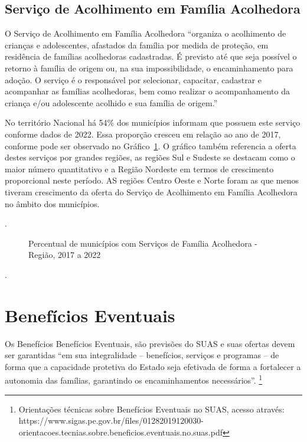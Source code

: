\documentclass[
  letterpaper,
  DIV=11,
  numbers=noendperiod]{scrreprt}
\begin{document}
\subsection{Serviço de Acolhimento em Família
Acolhedora}\label{serviuxe7o-de-acolhimento-em-famuxedlia-acolhedora}

O Serviço de Acolhimento em Família Acolhedora ``organiza o acolhimento
de crianças e adolescentes, afastados da família por medida de proteção,
em residência de famílias acolhedoras cadastradas. É previsto até que
seja possível o retorno à família de origem ou, na sua impossibilidade,
o encaminhamento para adoção. O serviço é o responsável por selecionar,
capacitar, cadastrar e acompanhar as famílias acolhedoras, bem como
realizar o acompanhamento da criança e/ou adolescente acolhido e sua
família de origem.''

No território Nacional há 54\% dos municípios informam que possuem este
serviço conforme dados de 2022. Essa proporção cresceu em relação ao ano
de 2017, conforme pode ser observado no
Gráfico~\ref{fig-fam_acolhedora}. O gráfico também referencia a oferta
destes serviços por grandes regiões, as regiões Sul e Sudeste se
destacam como o maior número quantitativo e a Região Nordeste em termos
de crescimento proporcional neste período. AS regiões Centro Oeste e
Norte foram as que menos tiveram crescimento da oferta do Serviço de
Acolhimento em Família Acolhedora no âmbito dos municípios.

.

\begin{figure}


\caption{\label{fig-fam_acolhedora}Percentual de municípios com Serviços
de Família Acolhedora - Região, 2017 a 2022}

\end{figure}%

.

\section{Benefícios Eventuais}\label{benefuxedcios-eventuais}

Os Benefícios Benefícios Eventuais, são previsões do SUAS e suas ofertas
devem ser garantidas ``em sua integralidade -- benefícios, serviços e
programas -- de forma que a capacidade protetiva do Estado seja
efetivada de forma a fortalecer a autonomia das famílias, garantindo os
encaminhamentos necessários''. \footnote{Orientações técnicas sobre
  Benefícios Eventuais no SUAS, acesso através:
  https://www.sigas.pe.gov.br/files/01282019120030-orientacoes.tecnias.sobre.beneficios.eventuais.no.suas.pdf}
\end{document}

